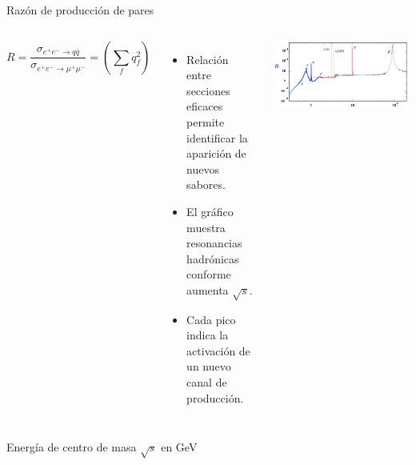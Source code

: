 \documentclass{beamer}
\begin{document}
\begin{frame}{Razón de producción de pares}
  \begin{columns}
    \[
    R = \frac{\sigma_{e^+e^- \to q\bar{q}}}{\sigma_{e^+e^- \to \mu^+\mu^-}} = \left( \sum_f q_f^2 \right)
    \]
    \begin{itemize}
      \item Relación entre secciones eficaces permite identificar la aparición de nuevos sabores.
      \item El gráfico muestra resonancias hadrónicas conforme aumenta \(\sqrt{s}\).
      \item Cada pico indica la activación de un nuevo canal de producción.
    \end{itemize}
    \includegraphics[width=\linewidth]{figures/produccion_pares.png}
  \end{columns}
  \vspace{0.5em}
  \centering
  {\scriptsize Energía de centro de masa \(\sqrt{s}\) en GeV}
\end{frame}
\end{document}
